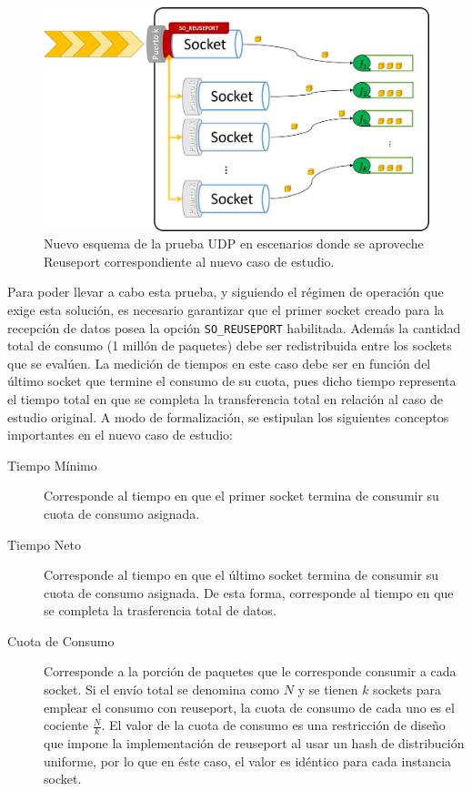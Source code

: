 \begin{figure}[!h]
	\centering
	\includegraphics[scale=.5]{imagenes/nuevocaso.png}
	\caption{Nuevo esquema de la prueba UDP en escenarios donde se aproveche Reuseport correspondiente al nuevo caso de estudio.}
	\label{fig:casoPruebaReuseport}
\end{figure}

Para poder llevar a cabo esta prueba, y siguiendo el régimen de operación que exige esta solución, es necesario garantizar que el primer socket creado para la recepción de datos posea la opción \verb=SO_REUSEPORT= habilitada. Además la cantidad total de consumo (1 millón de paquetes) debe ser redistribuida entre los sockets que se evalúen. La medición de tiempos en este caso debe ser en función del último socket que termine el consumo de su cuota, pues dicho tiempo representa el tiempo total en que se completa la transferencia total en relación al caso de estudio original. A modo de formalización, se estipulan los siguientes conceptos importantes en el nuevo caso de estudio:
\begin{description}
\item[Tiempo Mínimo] Corresponde al tiempo en que el primer socket termina de consumir su cuota de consumo asignada.
\item[Tiempo Neto] Corresponde al tiempo en que el último socket termina de consumir su cuota de consumo asignada. De esta forma, corresponde al tiempo en que se completa la trasferencia total de datos.
\item[Cuota de Consumo] Corresponde a la porción de paquetes que le corresponde consumir a cada socket. Si el envío total se denomina como $N$ y se tienen $k$ sockets para emplear el consumo con reuseport, la cuota de consumo de cada uno es el cociente $\frac{N}{k}$. El valor de la cuota de consumo es una restricción de diseño que impone la implementación de reuseport al usar un hash de distribución uniforme, por lo que en éste caso, el valor es idéntico para cada instancia socket.
\end{description}

